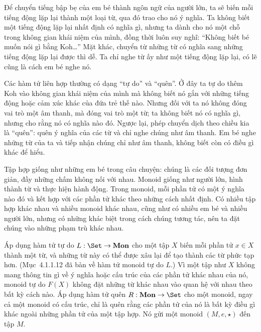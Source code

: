 Để chuyển tiếng bập bẹ của em bé thành ngôn ngữ của người lớn, ta sẽ biến mỗi tiếng động lặp lại thành một loại từ, qua đó trao cho nó ý nghĩa. Ta không biết một tiếng động lặp lại nhất định có nghĩa gì, nhưng ta dành cho nó một chỗ trong không gian khái niệm của mình, đồng thời luôn suy nghĩ: ``Không biết bé muốn nói gì bằng Koh\ldots'' Mặt khác, chuyển từ những từ có nghĩa sang những tiếng động lặp lại được thì dễ. Ta chỉ nghe từ ấy như một tiếng động lặp lại, có lẽ cũng là cách em bé nghe nó.

Các hàm tử liên hợp thường có dạng ``tự do'' và ``quên''. Ở đây ta tự do thêm Koh vào không gian khái niệm của mình mà không biết nó gắn với những tiếng động hoặc cảm xúc khác của đứa trẻ thế nào. Nhưng đối với ta nó không đóng vai trò một âm thanh, mà đóng vai trò một từ; ta không biết nó có nghĩa gì, nhưng cho rằng nó có nghĩa nào đó. Ngược lại, phép chuyển dịch theo chiều kia là ``quên'': quên ý nghĩa của các từ và chỉ nghe chúng như âm thanh. Em bé nghe những từ của ta và tiếp nhận chúng chỉ như âm thanh, không biết còn có điều gì khác để hiểu.

Tập hợp giống như những em bé trong câu chuyện: chúng là các đối tượng đơn giản, đầy những chấm không nối với nhau. Monoid giống như người lớn, hình thành từ và thực hiện hành động. Trong monoid, mỗi phần tử có một ý nghĩa nào đó và kết hợp với các phần tử khác theo những cách nhất định. Có nhiều tập hợp khác nhau và nhiều monoid khác nhau, cũng như có nhiều em bé và nhiều người lớn, nhưng có những khác biệt trong cách chúng tương tác, nên ta đặt chúng vào những phạm trù khác nhau.

Áp dụng hàm tử tự do $L:\Set\to\mathbf{Mon}$ cho một tập $X$ biến mỗi phần tử $x\in X$ thành một từ, và những từ này có thể được xâu lại để tạo thành các từ phức tạp hơn. (Mục~4.1.1.12 đã bàn về hàm tử monoid tự do $L$.) Vì một tập như $X$ không mang thông tin gì về ý nghĩa hoặc cấu trúc của các phần tử khác nhau của nó, monoid tự do $F(X)$ không đặt những từ khác nhau vào quan hệ với nhau theo bất kỳ cách nào. Áp dụng hàm tử quên $R:\mathbf{Mon}\to\Set$ cho một monoid, ngay cả một monoid có cấu trúc, chỉ là quên rằng các phần tử của nó là bất kỳ điều gì khác ngoài những phần tử của một tập hợp. Nó gửi một monoid $(M,e,\star)$ đến tập $M$.

